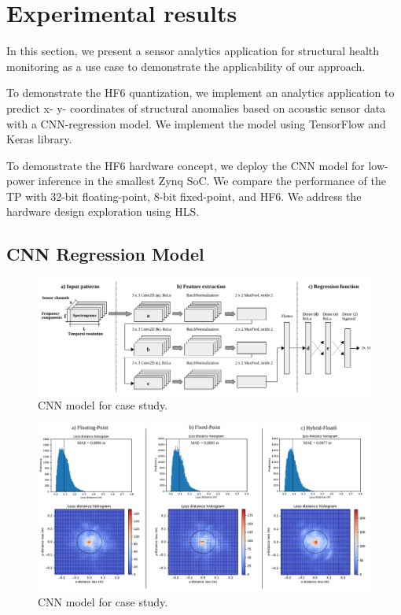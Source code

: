 \section{Experimental results}
\label{sec:experimental_results}
In this section, we present a sensor analytics application for structural health monitoring as a use case to demonstrate the applicability of our approach. 

To demonstrate the HF6 quantization, we implement an analytics application to predict x- y- coordinates of structural anomalies based on acoustic sensor data with a CNN-regression model. We implement the model using TensorFlow and Keras library.

To demonstrate the HF6 hardware concept, we deploy the CNN model for low-power inference in the smallest Zynq SoC. We compare the performance of the TP with 32-bit floating-point, 8-bit fixed-point, and HF6. We address the hardware design exploration using HLS.

\subsection{CNN Regression Model}

\begin{figure}[t!]
	\centering
	\includegraphics[width=\textwidth]{../figures/model.pdf}
	\caption{CNN model for case study.}
	\label{fig:models}
\end{figure}

\begin{figure}[t!]
	\centering
	\includegraphics[width=\textwidth]{../figures/histograms/model_evaluation.pdf}
	\caption{CNN model for case study.}
	\label{fig:model_evaluation}
\end{figure}

